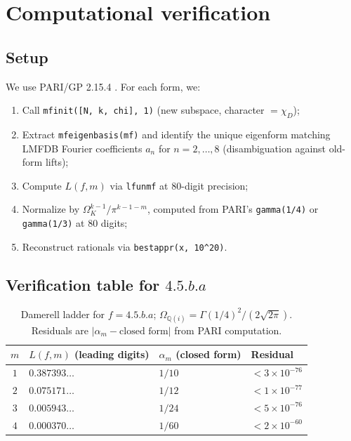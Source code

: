\documentclass[10pt]{article}
\theoremstyle{definition}
\newcommand{\Q}{\mathbb{Q}}
\newcommand{\OmI}{\Omega_{\Q(i)}}
\begin{document}
\section{Computational verification}
\label{sec:comp}

\subsection{Setup}

We use PARI/GP 2.15.4 \cite{PARI}.  For each form, we:
\begin{enumerate}
  \item Call \texttt{mfinit([N, k, chi], 1)} (new subspace, character $= \chi_D$);
  \item Extract \texttt{mfeigenbasis(mf)} and identify the unique eigenform
        matching LMFDB Fourier coefficients $a_n$ for $n = 2, \ldots, 8$
        (disambiguation against old-form lifts);
  \item Compute $L(f, m)$ via \texttt{lfunmf} at $80$-digit precision;
  \item Normalize by $\Omega_K^{k-1}/\pi^{k-1-m}$, computed from
        PARI's \texttt{gamma(1/4)} or \texttt{gamma(1/3)} at $80$ digits;
  \item Reconstruct rationals via \texttt{bestappr(x, 10\textasciicircum{}20)}.
\end{enumerate}

\subsection{Verification table for \texorpdfstring{$4.5.b.a$}{4.5.b.a}}

\begin{table}[h]
\centering
\begin{tabular}{clll}
\hline
$m$ & $L(f,m)$ (leading digits) & $\alpha_m$ (closed form) & Residual\\
\hline
$1$ & $0.387393\ldots$ & $1/10$ & $< 3\times10^{-76}$\\
$2$ & $0.075171\ldots$ & $1/12$ & $< 1\times10^{-77}$\\
$3$ & $0.005943\ldots$ & $1/24$ & $< 5\times10^{-76}$\\
$4$ & $0.000370\ldots$ & $1/60$ & $< 2\times10^{-60}$\\
\hline
\end{tabular}
\caption{Damerell ladder for $f = 4.5.b.a$; $\OmI = \Gamma(1/4)^2/(2\sqrt{2\pi})$.
Residuals are $|\alpha_m - \text{closed form}|$ from PARI computation.}
\label{tab:ladder}
\end{table}
\end{document}
